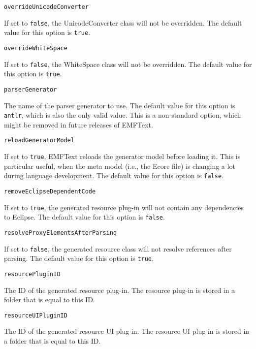 \noindent\texttt{overrideUnicodeConverter}
\begin{myindentpar}{1cm}
If set to \texttt{false}, the UnicodeConverter class will not be overridden. The default value for this option is \texttt{true}.
\end{myindentpar}

\noindent\texttt{overrideWhiteSpace}
\begin{myindentpar}{1cm}
If set to \texttt{false}, the WhiteSpace class will not be overridden. The default value for this option is \texttt{true}.
\end{myindentpar}

\noindent\texttt{parserGenerator}
\begin{myindentpar}{1cm}
The name of the parser generator to use. The default value for this option is \texttt{antlr}, which is also the only valid value. This is a non-standard option, which might be removed in future releases of EMFText.
\end{myindentpar}

\noindent\texttt{reloadGeneratorModel}
\begin{myindentpar}{1cm}
If set to \texttt{true}, EMFText reloads the generator model before loading it. This is particular useful, when the meta model (i.e., the Ecore file) is changing a lot during language development. The default value for this option is \texttt{false}.
\end{myindentpar}

\noindent\texttt{removeEclipseDependentCode}
\begin{myindentpar}{1cm}
If set to \texttt{true}, the generated resource plug-in will not contain any dependencies to Eclipse. The default value for this option is \texttt{false}.
\end{myindentpar}

\noindent\texttt{resolveProxyElementsAfterParsing}
\begin{myindentpar}{1cm}
If set to \texttt{false}, the generated resource class will not resolve references after parsing. The default value for this option is \texttt{true}.
\end{myindentpar}

\noindent\texttt{resourcePluginID}
\begin{myindentpar}{1cm}
The ID of the generated resource plug-in. The resource plug-in is stored in a folder that is equal to this ID.
\end{myindentpar}

\noindent\texttt{resourceUIPluginID}
\begin{myindentpar}{1cm}
The ID of the generated resource UI plug-in. The resource UI plug-in is stored in a folder that is equal to this ID.
\end{myindentpar}


